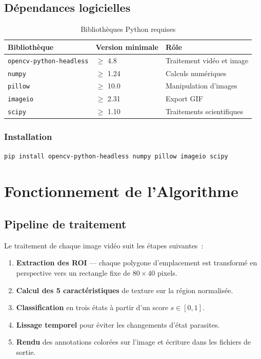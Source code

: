 \documentclass[12pt,a4paper]{report}
\begin{document}
\section{Dépendances logicielles}

\begin{table}[h!]
  \centering
  \caption{Bibliothèques Python requises}
  \begin{tabular}{lll}
    \toprule
    \textbf{Bibliothèque} & \textbf{Version minimale} & \textbf{Rôle} \\
    \midrule
    \texttt{opencv-python-headless} & $\geq$ 4.8 & Traitement vidéo et image \\
    \texttt{numpy}                  & $\geq$ 1.24 & Calculs numériques \\
    \texttt{pillow}                 & $\geq$ 10.0 & Manipulation d'images \\
    \texttt{imageio}                & $\geq$ 2.31 & Export GIF \\
    \texttt{scipy}                  & $\geq$ 1.10 & Traitements scientifiques \\
    \bottomrule
  \end{tabular}
\end{table}

\subsection*{Installation}

\begin{lstlisting}[language=bash, numbers=none]
pip install opencv-python-headless numpy pillow imageio scipy
\end{lstlisting}

\chapter{Fonctionnement de l'Algorithme}

\section{Pipeline de traitement}

Le traitement de chaque image vidéo suit les étapes suivantes~:

\begin{enumerate}
  \item \textbf{Extraction des ROI} — chaque polygone d'emplacement est transformé en perspective vers un rectangle fixe de $80 \times 40$ pixels.
  \item \textbf{Calcul des 5 caractéristiques} de texture sur la région normalisée.
  \item \textbf{Classification} en trois états à partir d'un score $s \in [0, 1]$.
  \item \textbf{Lissage temporel} pour éviter les changements d'état parasites.
  \item \textbf{Rendu} des annotations colorées sur l'image et écriture dans les fichiers de sortie.
\end{enumerate}
\end{document}
